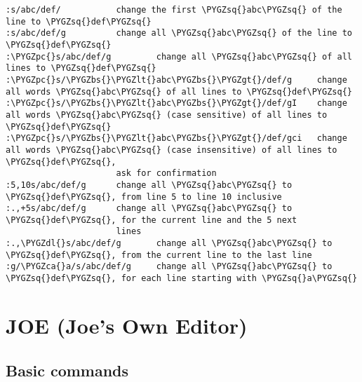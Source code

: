 \documentclass[letterpaper,10pt,english]{sphinxmanual}
\def\PYGZbs{\char`\\}
\def\PYGZca{\char`\^}
\def\PYGZlt{\char`\<}
\def\PYGZgt{\char`\>}
\def\PYGZpc{\char`\%}
\def\PYGZdl{\char`\$}
\def\PYGZsq{\char`\'}
\renewcommand\PYGZsq{\textquotesingle}
\begin{document}
\begin{Verbatim}[commandchars=\\\{\}]
:s/abc/def/           change the first \PYGZsq{}abc\PYGZsq{} of the line to \PYGZsq{}def\PYGZsq{}
:s/abc/def/g          change all \PYGZsq{}abc\PYGZsq{} of the line to \PYGZsq{}def\PYGZsq{}
:\PYGZpc{}s/abc/def/g         change all \PYGZsq{}abc\PYGZsq{} of all lines to \PYGZsq{}def\PYGZsq{}
:\PYGZpc{}s/\PYGZbs{}\PYGZlt{}abc\PYGZbs{}\PYGZgt{}/def/g     change all words \PYGZsq{}abc\PYGZsq{} of all lines to \PYGZsq{}def\PYGZsq{}
:\PYGZpc{}s/\PYGZbs{}\PYGZlt{}abc\PYGZbs{}\PYGZgt{}/def/gI    change all words \PYGZsq{}abc\PYGZsq{} (case sensitive) of all lines to \PYGZsq{}def\PYGZsq{}
:\PYGZpc{}s/\PYGZbs{}\PYGZlt{}abc\PYGZbs{}\PYGZgt{}/def/gci   change all words \PYGZsq{}abc\PYGZsq{} (case insensitive) of all lines to \PYGZsq{}def\PYGZsq{},
                      ask for confirmation
:5,10s/abc/def/g      change all \PYGZsq{}abc\PYGZsq{} to \PYGZsq{}def\PYGZsq{}, from line 5 to line 10 inclusive
:.,+5s/abc/def/g      change all \PYGZsq{}abc\PYGZsq{} to \PYGZsq{}def\PYGZsq{}, for the current line and the 5 next
                      lines
:.,\PYGZdl{}s/abc/def/g       change all \PYGZsq{}abc\PYGZsq{} to \PYGZsq{}def\PYGZsq{}, from the current line to the last line
:g/\PYGZca{}a/s/abc/def/g     change all \PYGZsq{}abc\PYGZsq{} to \PYGZsq{}def\PYGZsq{}, for each line starting with \PYGZsq{}a\PYGZsq{}
\end{Verbatim}


\section{JOE (Joe’s Own Editor)}
\label{editor/joe:joe-joes-own-editor}\label{editor/joe::doc}

\subsection{Basic commands}
\label{editor/joe:basic-commands}
\end{document}
